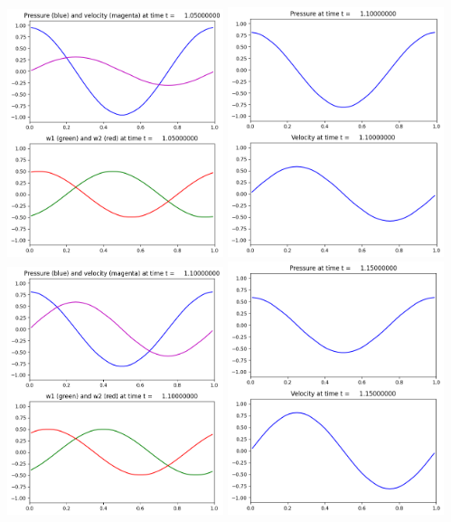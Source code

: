\documentclass[11pt]{article}
\begin{document}
\includegraphics[width=0.475\textwidth]{frame0021fig2.png}
\vskip 10pt 
\includegraphics[width=0.475\textwidth]{frame0022fig1.png}
\includegraphics[width=0.475\textwidth]{frame0022fig2.png}
\vskip 10pt 
\includegraphics[width=0.475\textwidth]{frame0023fig1.png}
\end{document}
